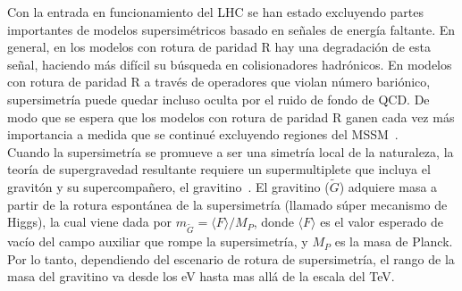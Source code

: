 Con la entrada en funcionamiento del LHC se han estado excluyendo
partes importantes de modelos supersimétricos basado en señales de
energía faltante. En general, en los modelos con rotura de paridad R hay
una degradación de esta señal, haciendo más difícil su búsqueda en
colisionadores hadrónicos. En modelos con rotura de paridad R a través
de operadores que violan número bariónico, supersimetría puede quedar
incluso oculta por el ruido de fondo de QCD. De modo que se espera que los
modelos con rotura de paridad R ganen cada vez más importancia a
medida que se continué excluyendo regiones del MSSM~\cite{Bomark:2011fj}.\\

Cuando la supersimetría se promueve a ser una simetría local de la
naturaleza, la teoría de supergravedad resultante requiere un
supermultiplete que incluya el gravitón y su supercompañero, el
gravitino~\cite{Martin:1997ns,Nilles:1983ge}. El gravitino ($\tilde
G$) adquiere masa a partir de la rotura espontánea de la
supersimetría (llamado súper mecanismo de Higgs), la cual viene dada
por $m_{\tilde G}=\langle F\rangle/M_P$, donde $\langle F\rangle$ es el valor esperado de vacío
del campo auxiliar que rompe la supersimetría, y $M_P$ es la masa de
Planck. Por lo tanto, dependiendo del escenario de rotura de
supersimetría, el rango de la masa del gravitino va desde los eV hasta
mas allá de la escala del TeV.

